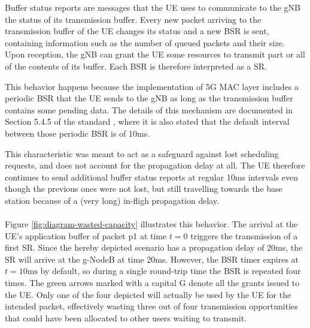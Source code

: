 Buffer status reports are messages that the \ac{UE} uses to communicate to the \ac{gNB} the status of its transmission buffer. Every new packet arriving to the transmission buffer of the \ac{UE} changes its status and a new \ac{BSR} is sent, containing information such as the number of queued packets and their size. Upon reception, the \ac{gNB} can grant the \ac{UE} some resources to transmit part or all of the contents of its buffer. Each \ac{BSR} is therefore interpreted as a \ac{SR}.

This behavior happens because the implementation of 5G \ac{MAC} layer includes a periodic \ac{BSR} that the \ac{UE} sends to the \ac{gNB} as long as the transmission buffer contains some pending data.
The details of this mechanism are documented in Section 5.4.5 of the standard \cite{etsi-mac-specification}, where it is also stated that the default interval between those periodic \ac{BSR} is of 10ms.

This characteristic was meant to act as a safeguard against lost scheduling requests, and does not account for the propagation delay at all. The \ac{UE} therefore continues to send additional buffer status reports at regular 10ms intervals even though the previous ones were not lost, but still travelling towards the base station because of a (very long) in-fligh propagation delay.

\paragraph{}
Figure \ref{fig:diagram-wasted-capacity} illustrates this behavior. The arrival at the \ac{UE}'s application buffer of packet p1 at time $t=0$ triggers the transmission of a first \ac{SR}. Since the hereby depicted scenario has a propagation delay of 20ms, the \ac{SR} will arrive at the g-NodeB at time 20ms. However, the \ac{BSR} timer expires at $t=10\text{ms}$ by default, so during a single round-trip time the \ac{BSR} is repeated four times. The green arrows marked with a capital G denote all the grants issued to the \ac{UE}. Only one of the four depicted will actually be used by the \ac{UE} for the intended packet, effectively wasting three out of four transmission opportunities that could have been allocated to other users waiting to transmit.

